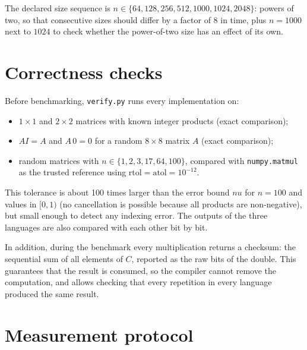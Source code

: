 \documentclass[12pt,a4paper]{report}
\begin{document}
The declared size sequence is $n \in \{64, 128, 256, 512, 1000, 1024, 2048\}$: powers of two, so that consecutive
sizes should differ by a factor of 8 in time, plus $n = 1000$ next to $1024$ to check whether the power-of-two size
has an effect of its own.

\section{Correctness checks}

Before benchmarking, \texttt{verify.py} runs every implementation on:
\begin{itemize}
  \item $1\times1$ and $2\times2$ matrices with known integer products (exact comparison);
  \item $AI = A$ and $A\,0 = 0$ for a random $8\times8$ matrix $A$ (exact comparison);
  \item random matrices with $n \in \{1, 2, 3, 17, 64, 100\}$, compared with \texttt{numpy.matmul} as the trusted
  reference using $\mathrm{rtol} = \mathrm{atol} = 10^{-12}$.
\end{itemize}
This tolerance is about 100 times larger than the error bound $n u$ for $n = 100$ and values in $[0,1)$ (no
cancellation is possible because all products are non-negative), but small enough to detect any indexing error. The
outputs of the three languages are also compared with each other bit by bit.

In addition, during the benchmark every multiplication returns a checksum: the sequential sum of all elements of $C$,
reported as the raw bits of the double. This guarantees that the result is consumed, so the compiler cannot remove the
computation, and allows checking that every repetition in every language produced the same result.

\section{Measurement protocol}
\end{document}
